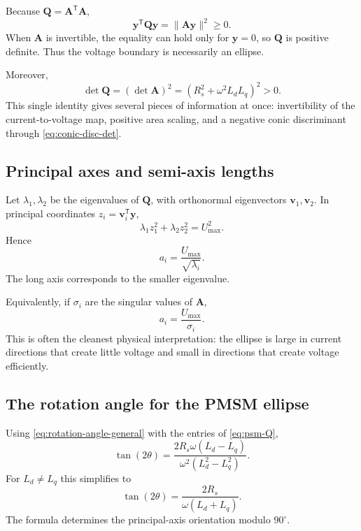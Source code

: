 \documentclass[11pt,a4paper]{article}
\newcommand{\Rs}{R_s}
\newcommand{\Ld}{L_d}
\newcommand{\Lq}{L_q}
\newcommand{\w}{\omega}
\newcommand{\Umax}{U_{\max}}
\newcommand{\T}{\mathsf{T}}
\newcommand{\vct}[1]{\bm{#1}}
\newcommand{\mat}[1]{\bm{#1}}
\begin{document}
Because $\mat Q=\mat A^\T\mat A$,
\begin{equation}
  \vct y^\T\mat Q\vct y=\|\mat A\vct y\|^2\ge0.
\end{equation}
When $\mat A$ is invertible, the equality can hold only for $\vct y=0$, so $\mat Q$ is positive definite. Thus the voltage boundary is necessarily an ellipse.

Moreover,
\begin{equation}
  \det\mat Q=(\det\mat A)^2
  =(\Rs^2+\w^2\Ld\Lq)^2>0.
  \label{eq:detQ-psm}
\end{equation}
This single identity gives several pieces of information at once: invertibility of the current-to-voltage map, positive area scaling, and a negative conic discriminant through \eqref{eq:conic-disc-det}.

\subsection{Principal axes and semi-axis lengths}

Let $\lambda_1,\lambda_2$ be the eigenvalues of $\mat Q$, with orthonormal eigenvectors $\vct v_1,\vct v_2$. In principal coordinates $z_i=\vct v_i^\T\vct y$,
\begin{equation}
  \lambda_1 z_1^2+\lambda_2 z_2^2=\Umax^2.
\end{equation}
Hence
\begin{equation}
  a_i=\frac{\Umax}{\sqrt{\lambda_i}}.
  \label{eq:psm-axis-eigen}
\end{equation}
The long axis corresponds to the smaller eigenvalue.

Equivalently, if $\sigma_i$ are the singular values of $\mat A$,
\begin{equation}
  a_i=\frac{\Umax}{\sigma_i}.
\end{equation}
This is often the cleanest physical interpretation: the ellipse is large in current directions that create little voltage and small in directions that create voltage efficiently.

\subsection{The rotation angle for the PMSM ellipse}

Using \eqref{eq:rotation-angle-general} with the entries of \eqref{eq:psm-Q},
\begin{equation}
  \tan(2\theta)
  =\frac{2\Rs\w(\Ld-\Lq)}{\w^2(\Ld^2-\Lq^2)}.
\end{equation}
For $\Ld\neq\Lq$ this simplifies to
\begin{equation}
  \boxed{
  \tan(2\theta)=\frac{2\Rs}{\w(\Ld+\Lq)}.
  }
  \label{eq:psm-angle}
\end{equation}
The formula determines the principal-axis orientation modulo $90^\circ$.
\end{document}
